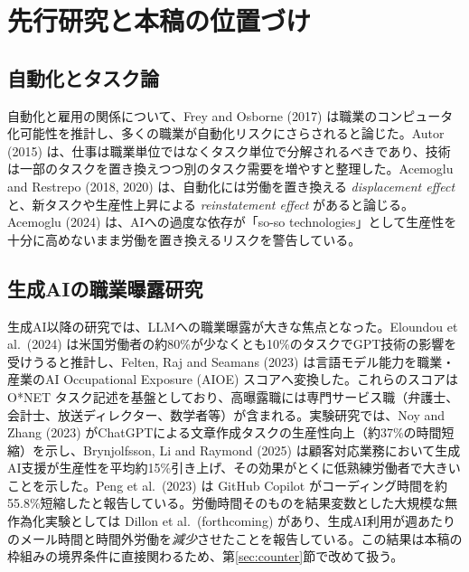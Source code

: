 \documentclass[11pt]{article}
\theoremstyle{plain}
\theoremstyle{definition}
\theoremstyle{remark}
\begin{document}
\section{先行研究と本稿の位置づけ}

\subsection{自動化とタスク論}
自動化と雇用の関係について、Frey and Osborne (2017) は職業のコンピュータ化可能性を推計し、多くの職業が自動化リスクにさらされると論じた。Autor (2015) は、仕事は職業単位ではなくタスク単位で分解されるべきであり、技術は一部のタスクを置き換えつつ別のタスク需要を増やすと整理した。Acemoglu and Restrepo (2018, 2020) は、自動化には労働を置き換える \emph{displacement effect} と、新タスクや生産性上昇による \emph{reinstatement effect} があると論じる。Acemoglu (2024) は、AIへの過度な依存が「so-so technologies」として生産性を十分に高めないまま労働を置き換えるリスクを警告している。

\subsection{生成AIの職業曝露研究}
生成AI以降の研究では、LLMへの職業曝露が大きな焦点となった。Eloundou et al.\ (2024) は米国労働者の約80\%が少なくとも10\%のタスクでGPT技術の影響を受けうると推計し、Felten, Raj and Seamans (2023) は言語モデル能力を職業・産業のAI Occupational Exposure (AIOE) スコアへ変換した。これらのスコアは O*NET タスク記述を基盤としており、高曝露職には専門サービス職（弁護士、会計士、放送ディレクター、数学者等）が含まれる。実験研究では、Noy and Zhang (2023) がChatGPTによる文章作成タスクの生産性向上（約37\%の時間短縮）を示し、Brynjolfsson, Li and Raymond (2025) は顧客対応業務において生成AI支援が生産性を平均約15\%引き上げ、その効果がとくに低熟練労働者で大きいことを示した。Peng et al.\ (2023) は GitHub Copilot がコーディング時間を約55.8\%短縮したと報告している。労働時間そのものを結果変数とした大規模な無作為化実験としては Dillon et al.\ (forthcoming) があり、生成AI利用が週あたりのメール時間と時間外労働を\emph{減少}させたことを報告している。この結果は本稿の枠組みの境界条件に直接関わるため、第\ref{sec:counter}節で改めて扱う。
\end{document}
